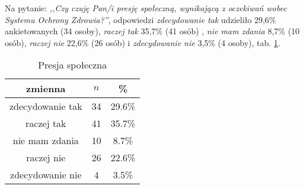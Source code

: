 
Na pytanie: \textit{,,Czy czuję Pan/i presję społeczną, wynikającą z oczekiwań wobec Systemu Ochrony Zdrowia?''}, odpowiedzi \textit{zdecydowanie tak} udzieliło 29,6\% ankietowanych (34 osoby), \textit{raczej tak} 35,7\% (41 osób) , \textit{nie mam zdania} 8,7\% (10 osób), \textit{raczej nie} 22,6\% (26 osób) i \textit{zdecydowanie nie} 3,5\% (4 osoby), tab. \ref{tab:Q15}.

\begin{table}[H]
\caption{Presja społeczna}
\centering
\begin{tabular}{ | c | c | c |}
\hline
zmienna & $n$ & \% \\
\hline
zdecydowanie tak  &  34  & 29.6\% \\
\hline
raczej tak  &  41  & 35.7\% \\
\hline
nie mam zdania  &  10  & 8.7\% \\
\hline
raczej nie  &  26  & 22.6\% \\
\hline
zdecydowanie nie  &  4  & 3.5\% \\
\hline
\end{tabular}
\label{tab:Q15}
\end{table}
